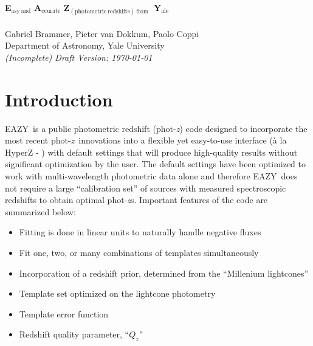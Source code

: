 \documentclass[11pt]{article}
\newcommand{\photoz}{\textrm{phot-}\textit{z}}
\newcommand{\photozs}{\textrm{phot-}\textit{z}\textrm{s}}
\newcommand{\eazy}{\textsc{EAZY}}
\begin{document}

\begin{center}
\vfill
\huge{\textbf{E}$_\mathrm{asy\ and}$ \textbf{A}$_\mathrm{ccurate}$ \textbf{Z}$_\mathrm{(photometric\ redshifts)\ from}$\textbf{\ Y}$_\mathrm{ale}$ }\\
\ \\
\Large{Gabriel Brammer, Pieter van Dokkum, Paolo Coppi}\\
\small{{Department of Astronomy, Yale University}} \\
\large{\emph{(Incomplete) Draft Version: \today}}\\
\end{center}


\tableofcontents

\newpage

\section{Introduction}

\eazy\ is a public photometric redshift (\photoz) code designed to incorporate
the most recent \photoz\ innovations into a flexible yet easy-to-use interface
(\`a la HyperZ - \cite{hyperz}) with default settings that will produce
high-quality results without significant optimization by the user.  The default
settings have been optimized to work with multi-wavelength photometric data
alone and therefore \eazy\ does not require a large ``calibration set'' of
sources with measured spectroscopic redshifts to obtain optimal \photozs. 
Important features of the code are summarized below:

\begin{itemize}

\item Fitting is done in linear units to naturally handle negative fluxes

\item Fit one, two, or many combinations of templates simultaneously

\item Incorporation of a redshift prior, determined from the ``Millenium
lightcones''

\item Template set optimized on the lightcone photometry

\item Template error function

\item Redshift quality parameter, ``$Q_z$''

\end{itemize}
\end{document}
